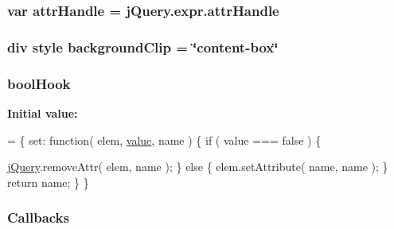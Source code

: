 \subsubsection[{\texorpdfstring{attr\+Handle}{attrHandle}}]{\setlength{\rightskip}{0pt plus 5cm}var attr\+Handle = j\+Query.\+expr.\+attr\+Handle}\hypertarget{jquery-3_82_81_8js_abedf49e04e7bca6a84f4d9f695ab0508}{}\label{jquery-3_82_81_8js_abedf49e04e7bca6a84f4d9f695ab0508}
\subsubsection[{\texorpdfstring{background\+Clip}{backgroundClip}}]{\setlength{\rightskip}{0pt plus 5cm}div style background\+Clip = \char`\"{}content-\/box\char`\"{}}\hypertarget{jquery-3_82_81_8js_adbba85353f0cf06c0afdc8063e67fbd8}{}\label{jquery-3_82_81_8js_adbba85353f0cf06c0afdc8063e67fbd8}
\subsubsection[{\texorpdfstring{bool\+Hook}{boolHook}}]{\setlength{\rightskip}{0pt plus 5cm}bool\+Hook}\hypertarget{jquery-3_82_81_8js_ab6bb4ec37bfc7fc470262b850bc5b553}{}\label{jquery-3_82_81_8js_ab6bb4ec37bfc7fc470262b850bc5b553}
{\bfseries Initial value\+:}
\begin{DoxyCode}
= \{
    \textcolor{keyword}{set}: \textcolor{keyword}{function}( elem, \hyperlink{jquery-3_82_81_8js_a9d32b6baf31ab8047d93bf7e388971b9}{value}, name ) \{
        \textcolor{keywordflow}{if} ( value === \textcolor{keyword}{false} ) \{

            
            \hyperlink{jquery-3_82_81_8js_a609525712f1102566c2b03866ceb2bba}{jQuery}.removeAttr( elem, name );
        \} \textcolor{keywordflow}{else} \{
            elem.setAttribute( name, name );
        \}
        \textcolor{keywordflow}{return} name;
    \}
\}
\end{DoxyCode}
\subsubsection[{\texorpdfstring{Callbacks}{Callbacks}}]{ Callbacks}\hypertarget{jquery-3_82_81_8js_add8d59d25831bb9b171fdbee8a18795b}{}\label{jquery-3_82_81_8js_add8d59d25831bb9b171fdbee8a18795b}

